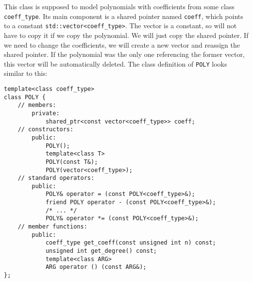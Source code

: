 \documentclass{article}
\newcommand{\code}[1]{\texttt{#1}}
\begin{document}
This class is supposed to model polynomials with coefficients from some class \code{coeff\_type}. Its main component is a shared pointer named \code{coeff}, which points to a constant \code{std::vector<coeff\_type>}. The vector is a constant, so will not have to copy it if we copy the polynomial. We will just copy the shared pointer. If we need to change the coefficients, we will create a new vector and reassign the shared pointer. If the polynomial was the only one referencing the former vector, this vector will be automatically deleted. The class definition of \code{POLY} looks similar to this:

\begin{lstlisting}
template<class coeff_type>
class POLY {
	// members:
		private:
			shared_ptr<const vector<coeff_type>> coeff;
	// constructors:
		public:
			POLY();
			template<class T>
			POLY(const T&);
			POLY(vector<coeff_type>);
	// standard operators:
		public:
			POLY& operator = (const POLY<coeff_type>&);
			friend POLY operator - (const POLY<coeff_type>&);
			/* ... */
			POLY& operator *= (const POLY<coeff_type>&);
	// member functions:
		public:
			coeff_type get_coeff(const unsigned int n) const;
			unsigned int get_degree() const;
			template<class ARG>
			ARG operator () (const ARG&);
};
\end{lstlisting}
\end{document}
